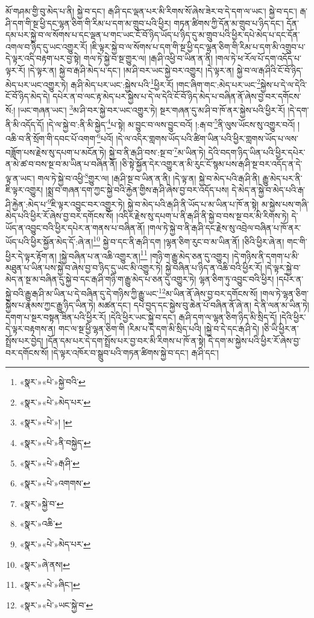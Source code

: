 མོ་གཤམ་གྱི་བུ་མེད་པ་ནི། སྐྱེ་བ་དང་། རྒ་ཤི་དང་ལྡན་པར་མི་རིགས་སོ་ཞེས་ཟེར་བ་དེ་དག་ལ་ཡང་། སྐྱེ་བ་དང་། རྒ་ཤི་དག་གི་སྔ་ཕྱི་དང་ལྷན་ཅིག་གི་རིམ་པ་དག་མ་གྲུབ་པའི་ཕྱིར། གཏན་ཚིགས་ཀྱི་དོན་མ་གྲུབ་པ་ཉིད་དང་། དོན་དམ་པར་སྐྱེ་བ་ལ་སོགས་པ་དང་ལྡན་པ་གང་ཡང་ངོ་བོ་ཉིད་ཡོད་པ་ཉིད་དུ་མ་གྲུབ་པའི་ཕྱིར་དཔེ་མེད་པ་དང་དོན་འགལ་བ་ཉིད་དུ་ཡང་འགྱུར་རོ། །ཇི་ལྟར་སྐྱེ་བ་ལ་སོགས་པ་དག་གི་སྔ་ཕྱི་དང་ལྷན་ཅིག་གི་རིམ་པ་དག་མི་འགྲུབ་པ་དེ་ལྟར་འདི་བརྟག་པར་བྱ་སྟེ། གལ་ཏེ་སྐྱེ་བ་སྔ་གྱུར་ལ། །རྒ་ཤི་འཕྱི་བ་ཡིན་ན་ནི། །གལ་ཏེ་ཕ་རོལ་པོ་དག་འདོད་པ་ལྟར་རོ། །དེ་ལྟར་ན། སྐྱེ་བ་རྒ་ཤི་མེད་པ་དང་། །མ་ཤི་བར་ཡང་སྐྱེ་བར་འགྱུར། །དེ་ལྟར་ན། སྐྱེ་བ་ལ་རྒ་ཤིའི་ངོ་བོ་ཉིད་མེད་པར་ཡང་འགྱུར་ཏེ། རྒ་ཤི་མེད་པར་ཡང་:སྐྱེས་པའི་\footnote{«སྣར་»«པེ་»སྐྱེ་བའི་}ཕྱིར་རོ། །གང་ཞིག་གང་:མེད་པར་ཡང་\footnote{«སྣར་»«པེ་»མེད་པར་}སྐྱེས་པ་དེ་ལ་དེའི་ངོ་བོ་ཉིད་མེད་དེ། དཔེར་ན་བ་ལང་རྟ་མེད་པར་སྐྱེས་པ་དེ་ལ་དེའི་ངོ་བོ་ཉིད་མེད་པ་བཞིན་ནོ་ཞེས་བྱ་བར་དགོངས་སོ:། །ཡང་གཞན་ཡང་། \footnote{«སྣར་»«པེ་»། ། }མ་ཤི་བར་སྐྱེ་བར་ཡང་འགྱུར་ཏེ། སྔར་གཞན་དུ་མ་ཤི་བ་ཁོ་ནར་སྐྱེས་པའི་ཕྱིར་རོ། །དེ་དག་ནི་མི་འདོད་དོ། །དེ་ལ་སྐྱེ་བ་:ནི་མི་སྐྱེད་\footnote{«སྣར་»«པེ་»ནི་བསྐྱེད་}པ་སྟེ། མ་བྱུང་བ་ལས་བྱུང་བའོ། །:རྒ་བ་\footnote{«སྣར་»«པེ་»རྒ་ཤི་}ནི་ལུས་ཡོངས་སུ་འགྱུར་བའོ། །འཆི་བ་ནི་སྲོག་གི་དབང་པོ་འགག་\footnote{«སྣར་»«པེ་»འགགས་}པའོ། །དེ་ལ་འདིར་གླགས་ཡོད་པའི་ཚིག་ཡིན་པའི་ཕྱིར་གླགས་ཡོད་པ་ལས་བཟློག་པས་རྗེས་སུ་དཔག་པ་མངོན་ཏེ། སྐྱེ་བ་ནི་རྒ་ཤི་བས་:སྔ་བ་\footnote{«སྣར་»སྐྱེ་བ་}མ་ཡིན་ཏེ། དེའི་བདག་ཉིད་ཡིན་པའི་ཕྱིར་དཔེར་ན་མེ་ཚ་བ་བས་སྔ་བ་མ་ཡིན་པ་བཞིན་ནོ། །ཅི་སྟེ་སྐྱོན་དེར་འགྱུར་ན་མི་རུང་ངོ་སྙམ་པས་རྒ་ཤི་སྔ་བར་འདོད་ན་དེ་ལྟ་ན་ཡང་། གལ་ཏེ་སྐྱེ་བ་འཕྱི་\footnote{«སྣར་»འཆི་}གྱུར་ལ། །རྒ་ཤི་སྔ་བ་ཡིན་ན་ནི། །དེ་ལྟ་ན། སྐྱེ་བ་མེད་པའི་རྒ་ཤི་ནི། རྒྱུ་མེད་པར་ནི་ཇི་ལྟར་འགྱུར། །སྨྲ་བ་གཞན་དག་ཀྱང་སྐྱེ་བའི་རྐྱེན་གྱིས་རྒ་ཤི་ཞེས་བྱ་བར་འདོད་པས། དེ་མེད་ན་སྐྱེ་བ་མེད་པའི་རྒ་ཤི་རྐྱེན་:མེད་པ་\footnote{«སྣར་»«པེ་»མེད་པར་}ཇི་ལྟར་འབྱུང་བར་འགྱུར་ཏེ། སྐྱེ་བ་མེད་པའི་རྒ་ཤི་ནི་ཡོད་པ་མ་ཡིན་པ་ཁོ་ན་སྟེ། མ་སྐྱེས་པས་གཞི་མེད་པའི་ཕྱིར་རོ་ཞེས་བྱ་བར་དགོངས་སོ། །འདིར་རྗེས་སུ་དཔག་པ་ནི་རྒ་ཤི་ནི་སྐྱེ་བ་བས་སྔ་བར་མི་རིགས་ཏེ། དེ་ཡོད་ན་འབྱུང་བའི་ཕྱིར་དཔེར་ན་གནས་པ་བཞིན་ནོ། །གལ་ཏེ་སྐྱེ་བ་ནི་རྒ་ཤི་དང་རྗེས་སུ་འབྲེལ་བཞིན་པ་ཁོ་ནར་ཡོད་པའི་ཕྱིར་སྐྱོན་མེད་དོ་:ཞེ་ན།\footnote{«སྣར་»ཞེ་ནས།} སྐྱེ་བ་དང་ནི་རྒ་ཤི་དག །ལྷན་ཅིག་རུང་བ་མ་ཡིན་ནོ། །ཅིའི་ཕྱིར་ཞེ་ན། གང་གི་ཕྱིར་དེ་ལྟར་རྟོག་ན། །སྐྱེ་བཞིན་པ་ན་འཆི་འགྱུར་ན།\footnote{«སྣར་»«པེ་»ཞིང་།} །གཉི་ག་རྒྱུ་མེད་ཅན་དུ་འགྱུར། །དེ་གཉིས་ནི་དགག་པ་མི་མཐུན་པ་ཡིན་པས་སྐྱེ་བ་ཞེས་བྱ་བ་ཉིད་དུ་ཡང་མི་འགྱུར་ཏེ། སྐྱེ་བཞིན་པ་ཉིད་ན་འཆི་བའི་ཕྱིར་རོ། །དེ་ལྟར་སྐྱེ་བ་མེད་ན་སྔ་མ་བཞིན་དུ་སྐྱེ་བ་དང་རྒ་ཤི་གཉི་ག་རྒྱུ་མེད་པ་ཅན་དུ་འགྱུར་ཏེ། ལྷན་ཅིག་ཏུ་འབྱུང་བའི་ཕྱིར། །དཔེར་ན་སྐྱེ་བའི་རྒྱུ་རྒ་ཤི་མ་ཡིན་པ་དེ་བཞིན་དུ་དེ་གཉིས་ཀྱི་རྒྱུ་ཡང་\footnote{«སྣར་»«པེ་»ཡང་སྐྱེ་བ་}མ་ཡིན་ནོ་ཞེས་བྱ་བར་དགོངས་སོ། །གལ་ཏེ་ལྷན་ཅིག་སྐྱེས་པ་རྣམས་ཀྱང་རྒྱུ་ཉིད་ཡིན་ཏེ། མཚན་དང་། དཔེ་བྱད་དང་སྐྱེས་བུ་ཆེན་པོ་བཞིན་ནོ་ཞེ་ན། དེ་ནི་ལན་མ་ཡིན་ཏེ། དགག་པ་སྔར་བསྟན་ཟིན་པའི་ཕྱིར་རོ། །དེའི་ཕྱིར་ཡང་སྐྱེ་བ་དང་། རྒ་ཤི་དག་ལ་ལྷན་ཅིག་ཉིད་མི་སྲིད་དོ། །དེའི་ཕྱིར་དེ་ལྟར་བརྟགས་ན། གང་ལ་སྔ་ཕྱི་ལྷན་ཅིག་གི །རིམ་པ་དེ་དག་མི་སྲིད་པའི། །སྐྱེ་བ་དེ་དང་རྒ་ཤི་དེ། །ཅི་ཡི་ཕྱིར་ན་སྤྲོས་པར་བྱེད། །དོན་དམ་པར་དེ་དག་སྤྲོས་པར་བྱ་བར་མི་རིགས་པ་ཁོ་ན་སྟེ། དེ་དག་མ་སྐྱེས་པའི་ཕྱིར་རོ་ཞེས་བྱ་བར་དགོངས་སོ། །དེ་ལྟར་འཁོར་བ་སྒྲུབ་པའི་གཏན་ཚིགས་སྐྱེ་བ་དང་། རྒ་ཤི་དང་། 